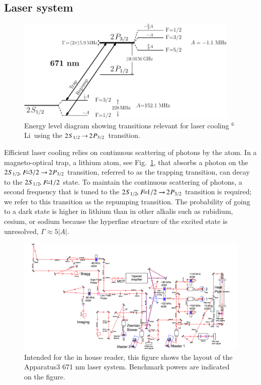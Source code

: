 \documentclass[oneside,12pt]{memoir}
\newcommand{\twos}[1]{\ensuremath{\hspace{-1pt}2\hspace{0.5pt}\hspace{0pt}S_{#1}\hspace{-1pt}}}
\newcommand{\twop}[1]{\ensuremath{\hspace{-1pt}2\hspace{0.5pt}\hspace{0pt}P_{#1}\hspace{-1pt}}}
\newcommand{\cm}{\ensuremath{,\hspace{1pt}}}
\newcommand{\f}[1]{\ensuremath{F\hspace{-5pt}=\hspace{-4pt}#1}}
\newcommand{\red}{\ensuremath{ \twos{1/2}\hspace{-0.0pt}\rightarrow\hspace{-0.0pt}\twop{3/2} }\ }
\newcommand{\li} {\ensuremath{^{6}}Li\ }
\begin{document}
\subsection{Laser system}

\begin{figure} \centering
\includegraphics[width=0.95\textwidth]{../figures/levels/671-levels/lithium.pdf}
\caption[Lithium-6 energy level diagram]{\small Energy level diagram showing
transitions relevant for laser cooling \li using the \red transition. }
\label{fig:671levels} \end{figure} Efficient laser cooling relies on continuous
scattering of photons by the atom.  In a magneto-optical trap, a lithium atom,
see Fig.~\ref{fig:671levels}, that absorbs a photon on the
$\twos{1/2}\cm\f{3/2}\rightarrow\twop{3/2}$ transition, referred to as the
trapping transition, can decay to the
$\twos{1/2}\cm\f{1/2}$ state.  To maintain the continuous scattering of photons, a
second frequency that is tuned to the
$\twos{1/2}\cm\f{1/2}\rightarrow\twop{3/2}$ transition is required; we refer to
this transition as the repumping transition.  The probability of going to a
dark state is higher in lithium than in other alkalis such as rubidium, cesium,
or sodium  because the hyperfine structure of the excited state is unresolved,
$\Gamma\approx 5|A|$.  \begin{figure} \centering
\includegraphics[width=1.\textwidth]{../figures/671setup/671setup(v4).pdf}
\vspace{1cm} \par \caption[671 nm laser system]{\small Intended for the in
house reader, this figure shows the layout of the Apparatus3 671 nm laser
system.  Benchmark powers are indicated on the figure.  } \label{fig:671system}
\end{figure} 
\end{document}
